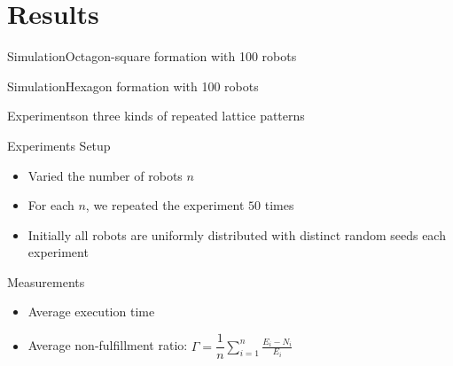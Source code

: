 \documentclass[10pt]{beamer}
\begin{document}
\section{Results}
\begin{frame}{Simulation}{Octagon-square formation with 100 robots}
  \begin{center}
  \end{center}
\end{frame}
\begin{frame}{Simulation}{Hexagon formation with 100 robots}
  \begin{center}
  \end{center}
\end{frame}

\begin{frame}{Experiments}{on three kinds of repeated
lattice patterns}
  \begin{block}{Experiments Setup}
    \begin{itemize}
    \item Varied the number of robots $n$
    \item For each $n$, we repeated the experiment $50$ times
    \item Initially all robots are uniformly distributed with distinct
      random seeds each experiment
    \end{itemize}
  \end{block}
  \begin{block}{Measurements}
    \begin{itemize}
    \item Average execution time
    \item Average non-fulfillment ratio: $\Gamma =
      \dfrac{1}{n}\sum\limits_{i=1}^n \frac{E_i - N_i}{E_i}$
    \end{itemize}
  \end{block}
\end{frame}
\end{document}
